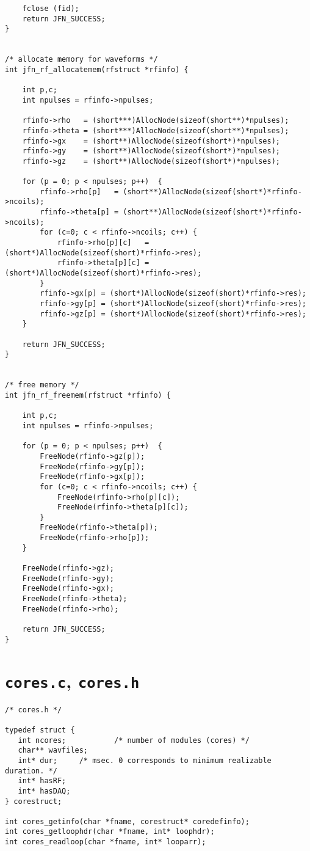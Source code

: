 \begin{lstlisting}
	fclose (fid);
	return JFN_SUCCESS;
}


/* allocate memory for waveforms */
int jfn_rf_allocatemem(rfstruct *rfinfo) {

	int p,c;
	int npulses = rfinfo->npulses;

	rfinfo->rho   = (short***)AllocNode(sizeof(short**)*npulses);
	rfinfo->theta = (short***)AllocNode(sizeof(short**)*npulses);
	rfinfo->gx    = (short**)AllocNode(sizeof(short*)*npulses);
	rfinfo->gy    = (short**)AllocNode(sizeof(short*)*npulses);
	rfinfo->gz    = (short**)AllocNode(sizeof(short*)*npulses);

	for (p = 0; p < npulses; p++)  {
		rfinfo->rho[p]   = (short**)AllocNode(sizeof(short*)*rfinfo->ncoils);
		rfinfo->theta[p] = (short**)AllocNode(sizeof(short*)*rfinfo->ncoils);
		for (c=0; c < rfinfo->ncoils; c++) {
			rfinfo->rho[p][c]   = (short*)AllocNode(sizeof(short)*rfinfo->res);
			rfinfo->theta[p][c] = (short*)AllocNode(sizeof(short)*rfinfo->res);
		}
		rfinfo->gx[p] = (short*)AllocNode(sizeof(short)*rfinfo->res);
		rfinfo->gy[p] = (short*)AllocNode(sizeof(short)*rfinfo->res);
		rfinfo->gz[p] = (short*)AllocNode(sizeof(short)*rfinfo->res);
	}

	return JFN_SUCCESS;
}


/* free memory */
int jfn_rf_freemem(rfstruct *rfinfo) {

	int p,c;
	int npulses = rfinfo->npulses;

	for (p = 0; p < npulses; p++)  {
		FreeNode(rfinfo->gz[p]);
		FreeNode(rfinfo->gy[p]);
		FreeNode(rfinfo->gx[p]);
		for (c=0; c < rfinfo->ncoils; c++) {
			FreeNode(rfinfo->rho[p][c]);
			FreeNode(rfinfo->theta[p][c]);
		}
		FreeNode(rfinfo->theta[p]);
		FreeNode(rfinfo->rho[p]);
	}

	FreeNode(rfinfo->gz);
	FreeNode(rfinfo->gy);
	FreeNode(rfinfo->gx);
	FreeNode(rfinfo->theta);
	FreeNode(rfinfo->rho);

	return JFN_SUCCESS;
}

\end{lstlisting}

\section{ {\tt cores.c}, {\tt cores.h} }  

\begin{lstlisting}
/* cores.h */

typedef struct {
   int ncores;           /* number of modules (cores) */
   char** wavfiles;
   int* dur;     /* msec. 0 corresponds to minimum realizable duration. */
   int* hasRF;
   int* hasDAQ;
} corestruct;

int cores_getinfo(char *fname, corestruct* coredefinfo);
int cores_getloophdr(char *fname, int* loophdr);
int cores_readloop(char *fname, int* looparr);
\end{lstlisting}

